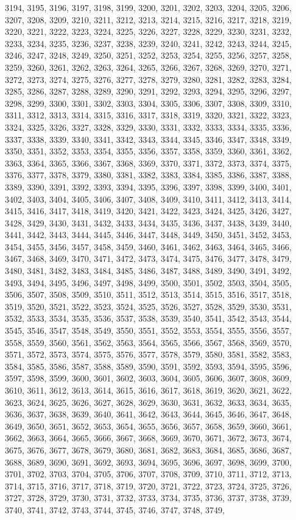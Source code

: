 \documentclass[a4paper,11pt]{article}
\numberwithin{equation}{section}
\begin{document}
3194, 3195, 3196, 3197, 3198, 3199, 3200, 3201, 3202, 3203, 3204, 3205, 3206, 3207, 3208, 3209, 3210, 3211, 3212, 3213, 3214, 3215, 3216, 3217, 3218, 3219, 3220, 3221, 3222, 3223, 3224, 3225, 3226, 3227, 3228, 3229, 3230, 3231, 3232, 3233, 3234, 3235, 3236, 3237, 3238, 3239, 3240, 3241, 3242, 3243, 3244, 3245, 3246, 3247, 3248, 3249, 3250, 3251, 3252, 3253, 3254, 3255, 3256, 3257, 3258, 3259, 3260, 3261, 3262, 3263, 3264, 3265, 3266, 3267, 3268, 3269, 3270, 3271, 3272, 3273, 3274, 3275, 3276, 3277, 3278, 3279, 3280, 3281, 3282, 3283, 3284, 3285, 3286, 3287, 3288, 3289, 3290, 3291, 3292, 3293, 3294, 3295, 3296, 3297, 3298, 3299, 3300, 3301, 3302, 3303, 3304, 3305, 3306, 3307, 3308, 3309, 3310, 3311, 3312, 3313, 3314, 3315, 3316, 3317, 3318, 3319, 3320, 3321, 3322, 3323, 3324, 3325, 3326, 3327, 3328, 3329, 3330, 3331, 3332, 3333, 3334, 3335, 3336, 3337, 3338, 3339, 3340, 3341, 3342, 3343, 3344, 3345, 3346, 3347, 3348, 3349, 3350, 3351, 3352, 3353, 3354, 3355, 3356, 3357, 3358, 3359, 3360, 3361, 3362, 3363, 3364, 3365, 3366, 3367, 3368, 3369, 3370, 3371, 3372, 3373, 3374, 3375, 3376, 3377, 3378, 3379, 3380, 3381, 3382, 3383, 3384, 3385, 3386, 3387, 3388, 3389, 3390, 3391, 3392, 3393, 3394, 3395, 3396, 3397, 3398, 3399, 3400, 3401, 3402, 3403, 3404, 3405, 3406, 3407, 3408, 3409, 3410, 3411, 3412, 3413, 3414, 3415, 3416, 3417, 3418, 3419, 3420, 3421, 3422, 3423, 3424, 3425, 3426, 3427, 3428, 3429, 3430, 3431, 3432, 3433, 3434, 3435, 3436, 3437, 3438, 3439, 3440, 3441, 3442, 3443, 3444, 3445, 3446, 3447, 3448, 3449, 3450, 3451, 3452, 3453, 3454, 3455, 3456, 3457, 3458, 3459, 3460, 3461, 3462, 3463, 3464, 3465, 3466, 3467, 3468, 3469, 3470, 3471, 3472, 3473, 3474, 3475, 3476, 3477, 3478, 3479, 3480, 3481, 3482, 3483, 3484, 3485, 3486, 3487, 3488, 3489, 3490, 3491, 3492, 3493, 3494, 3495, 3496, 3497, 3498, 3499, 3500, 3501, 3502, 3503, 3504, 3505, 3506, 3507, 3508, 3509, 3510, 3511, 3512, 3513, 3514, 3515, 3516, 3517, 3518, 3519, 3520, 3521, 3522, 3523, 3524, 3525, 3526, 3527, 3528, 3529, 3530, 3531, 3532, 3533, 3534, 3535, 3536, 3537, 3538, 3539, 3540, 3541, 3542, 3543, 3544, 3545, 3546, 3547, 3548, 3549, 3550, 3551, 3552, 3553, 3554, 3555, 3556, 3557, 3558, 3559, 3560, 3561, 3562, 3563, 3564, 3565, 3566, 3567, 3568, 3569, 3570, 3571, 3572, 3573, 3574, 3575, 3576, 3577, 3578, 3579, 3580, 3581, 3582, 3583, 3584, 3585, 3586, 3587, 3588, 3589, 3590, 3591, 3592, 3593, 3594, 3595, 3596, 3597, 3598, 3599, 3600, 3601, 3602, 3603, 3604, 3605, 3606, 3607, 3608, 3609, 3610, 3611, 3612, 3613, 3614, 3615, 3616, 3617, 3618, 3619, 3620, 3621, 3622, 3623, 3624, 3625, 3626, 3627, 3628, 3629, 3630, 3631, 3632, 3633, 3634, 3635, 3636, 3637, 3638, 3639, 3640, 3641, 3642, 3643, 3644, 3645, 3646, 3647, 3648, 3649, 3650, 3651, 3652, 3653, 3654, 3655, 3656, 3657, 3658, 3659, 3660, 3661, 3662, 3663, 3664, 3665, 3666, 3667, 3668, 3669, 3670, 3671, 3672, 3673, 3674, 3675, 3676, 3677, 3678, 3679, 3680, 3681, 3682, 3683, 3684, 3685, 3686, 3687, 3688, 3689, 3690, 3691, 3692, 3693, 3694, 3695, 3696, 3697, 3698, 3699, 3700, 3701, 3702, 3703, 3704, 3705, 3706, 3707, 3708, 3709, 3710, 3711, 3712, 3713, 3714, 3715, 3716, 3717, 3718, 3719, 3720, 3721, 3722, 3723, 3724, 3725, 3726, 3727, 3728, 3729, 3730, 3731, 3732, 3733, 3734, 3735, 3736, 3737, 3738, 3739, 3740, 3741, 3742, 3743, 3744, 3745, 3746, 3747, 3748, 3749, 
\end{document}

